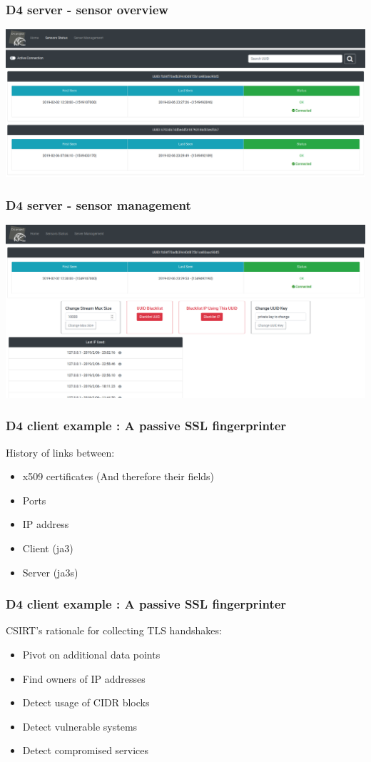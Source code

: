 \documentclass{beamer}
\begin{document}
\begin{frame}
        \frametitle{D4 server - sensor overview}
        \includegraphics[scale=0.18]{d4-1.png}
\end{frame}


\begin{frame}
        \frametitle{D4 server - sensor management}
        \includegraphics[scale=0.18]{d4-2.png}
\end{frame}

\begin{frame}
        \frametitle{D4 client example : A passive SSL fingerprinter}

        History of links between:
        \begin{itemize}
          \item x509 certificates (And therefore their fields) 
          \item Ports
          \item IP address
          \item Client (ja3)
          \item Server (ja3s)
        \end{itemize}
\end{frame}
        
\begin{frame}
        \frametitle{D4 client example : A passive SSL fingerprinter}
        CSIRT's rationale for collecting TLS handshakes:
        \begin{itemize}
          \item Pivot on additional data points
          \item Find owners of IP addresses
          \item Detect usage of CIDR blocks
          \item Detect vulnerable systems
          \item Detect compromised services
        \end{itemize}
\end{frame}
\end{document}
